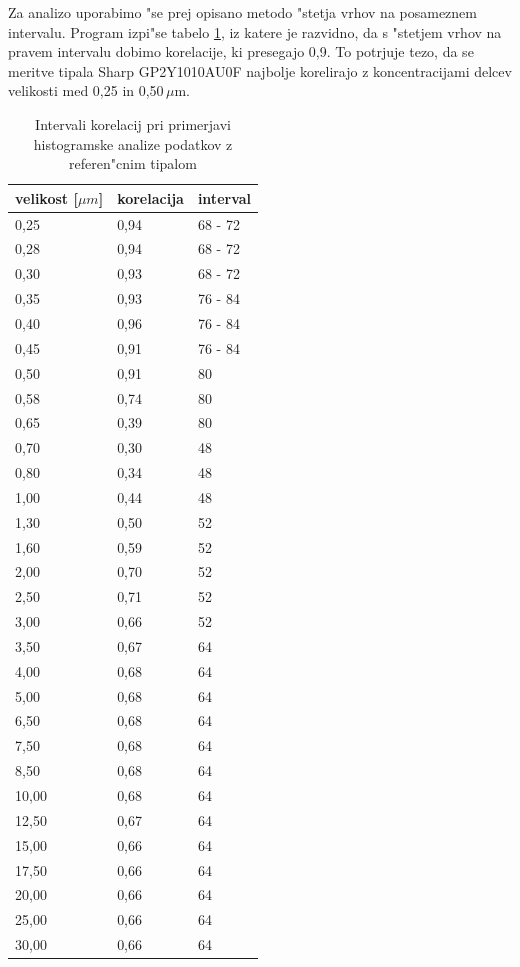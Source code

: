 \documentclass[12pt,a4paper]{article}
\begin{document}
Za analizo uporabimo "se prej opisano metodo "stetja vrhov na posameznem intervalu. Program izpi"se tabelo \ref{table:correlations}, iz katere je razvidno, da s "stetjem vrhov na pravem intervalu dobimo korelacije, ki presegajo 0,9. To potrjuje tezo, da se meritve tipala Sharp GP2Y1010AU0F najbolje korelirajo z koncentracijami delcev velikosti med 0,25 in 0,50\,$\mu$m. 

\begin{table}[H]
	\centering
	\begin{tabular}{lll}
		velikost [$\mu m$] & korelacija & interval \\
		\hline
		0,25 & 0,94 & 68 - 72 \\
		0,28 & 0,94 & 68 - 72 \\
		0,30 & 0,93 & 68 - 72 \\
		0,35 & 0,93 & 76 - 84 \\
		0,40 & 0,96 & 76 - 84 \\
		0,45 & 0,91 & 76 - 84 \\
		0,50 & 0,91 & 80 \\
		0,58 & 0,74 & 80 \\
		0,65 & 0,39 & 80 \\
		0,70 & 0,30 & 48 \\
		0,80 & 0,34 & 48 \\
		1,00 & 0,44 & 48 \\
		1,30 & 0,50 & 52 \\
		1,60 & 0,59 & 52 \\
		2,00 & 0,70 & 52 \\
		2,50 & 0,71 & 52 \\
		3,00 & 0,66 & 52 \\
		3,50 & 0,67 & 64 \\
		4,00 & 0,68 & 64 \\
		5,00 & 0,68 & 64 \\
		6,50 & 0,68 & 64 \\
		7,50 & 0,68 & 64 \\
		8,50 & 0,68 & 64 \\
		10,00 & 0,68 & 64 \\
		12,50 & 0,67 & 64 \\
		15,00 & 0,66 & 64 \\
		17,50 & 0,66 & 64 \\
		20,00 & 0,66 & 64 \\
		25,00 & 0,66 & 64 \\
		30,00 & 0,66 & 64
		
	\end{tabular}
	\caption{Intervali korelacij pri primerjavi histogramske analize podatkov z referen"cnim tipalom}
	\label{table:correlations}
	\def\arraystretch{1}
\end{table}
\end{document}
